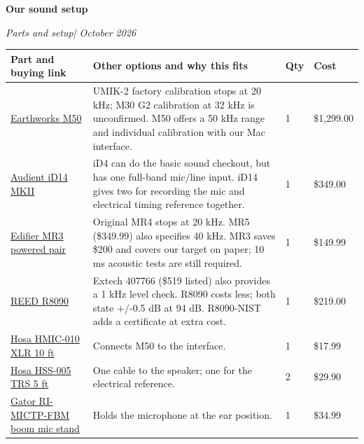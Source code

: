 \documentclass[11pt,letterpaper]{article}
\begin{document}
\begin{center}
{\fontsize{20}{24}\selectfont\bfseries Our sound setup}\par
{\itshape Parts and setup\enspace | October 2026}
\end{center}
{\fontsize{10.5}{12.4}\selectfont
\begin{tabularx}{\linewidth}{@{}P{1.90in} L C{0.28in} R{0.78in}@{}}\toprule
\textbf{Part and buying link} & \textbf{Other options and why this fits} & \textbf{Qty} & \textbf{Cost}\\\midrule
\href{https://www.bhphotovideo.com/c/product/359562-REG/Earthworks_M50_M50_Measurment_Microphone.html}{Earthworks M50} & UMIK-2 factory calibration stops at 20 kHz; M30 G2 calibration at 32 kHz is unconfirmed. M50 offers a 50 kHz range and individual calibration with our Mac interface. & 1 & \$1,299.00 \\\addlinespace[4pt]
\href{https://www.bhphotovideo.com/c/product/1641632-REG/audient_id14_mkii_2_channel_usb2_interface_and.html}{Audient iD14 MKII} & iD4 can do the basic sound checkout, but has one full-band mic/line input. iD14 gives two for recording the mic and electrical timing reference together. & 1 & \$349.00 \\\addlinespace[4pt]
\href{https://us.edifier.com/products/mr3}{Edifier MR3 powered pair} & Original MR4 stops at 20 kHz. MR5 (\$349.99) also specifies 40 kHz. MR3 saves \$200 and covers our target on paper; 10 ms acoustic tests are still required. & 1 & \$149.99 \\\addlinespace[4pt]
\href{https://www.globaltestsupply.com/product/reed-r8090-sound-level-calibrator}{REED R8090} & Extech 407766 (\$519 listed) also provides a 1 kHz level check. R8090 costs less; both state +/-0.5 dB at 94 dB. R8090-NIST adds a certificate at extra cost. & 1 & \$219.00 \\\addlinespace[4pt]
\href{https://www.sweetwater.com/store/detail/HMIC010--hosa-hmic-010-pro-microphone-cable-rean-xlr3f-to-xlr3m-10-ft}{Hosa HMIC-010 XLR 10 ft} & Connects M50 to the interface. & 1 & \$17.99 \\\addlinespace[4pt]
\href{https://www.sweetwater.com/store/detail/HSS005--hosa-hss-005-pro-balanced-interconnect-rean-1-4-in-trs-to-same-5-foot}{Hosa HSS-005 TRS 5 ft} & One cable to the speaker; one for the electrical reference. & 2 & \$29.90 \\\addlinespace[4pt]
\href{https://www.sweetwater.com/store/detail/RIMICTPFBM--rok-it-tripod-microphone-stand-with-fixed-boom}{Gator RI-MICTP-FBM boom mic stand} & Holds the microphone at the ear position. & 1 & \$34.99 \\\bottomrule
\end{tabularx}}
\end{document}
